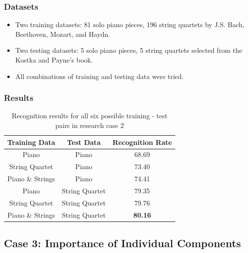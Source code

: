 \documentclass{beamer}
\begin{document}
\begin{frame}
	\frametitle{Datasets}
	\begin{itemize}
		\item Two training datasets: 81 solo piano pieces, 196 string quartets by J.S. Bach, Beethoven, Mozart, and Haydn.
		\item Two testing datasets: 5 solo piano pieces, 5 string quartets selected from the Kostka and Payne's book.
		\item All combinations of training and testing data were tried.
	\end{itemize}
	
\end{frame}  

\begin{frame}
	\frametitle{Results}
	
	\begin{table}\small
\centering
\begin{tabular}{|c|c|c|} \hline
\textbf{Training Data} & \textbf{Test Data} & \textbf{Recognition Rate} \\ \hline
Piano & Piano & 68.69 \\ \hline
String Quartet & Piano & 73.40 \\ \hline
Piano \& Strings & Piano & 74.41 \\ \hline
Piano & String Quartet & 79.35 \\ \hline
String Quartet & String Quartet & 79.76 \\ \hline
Piano \& Strings & String Quartet & \textbf{80.16} \\ \hline
\end{tabular}
\caption{Recognition results for all six possible training - test pairs in research case 2}
\label{tab:tab5}
\end{table}
\end{frame} 



\subsection[Case 3: Importance of Individual Components]{Case 3: Importance of Individual Components}
\end{document}
